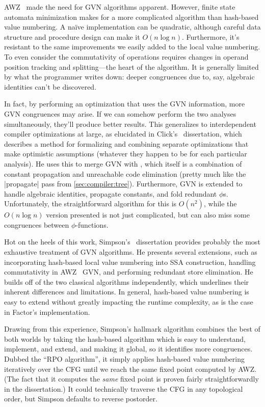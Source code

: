 AWZ~ made the need for \gls{GVN} algorithms apparent.  However,
finite state automata minimization makes for a more complicated algorithm than
hash-based value numbering.  A na\"{i}ve implementation can be quadratic,
although careful data structure and procedure design can make it $O(n\log n)$.
Furthermore, it's resistant to the same improvements we easily added to the
local value numbering.  To even consider the commutativity of operations
requires changes in operand position tracking and splitting---the heart of the
algorithm.  It is generally limited by what the programmer writes down: deeper
congruences due to, say, algebraic identities can't be discovered.

In fact, by performing an optimization that uses the \gls{GVN} information,
more \gls{GVN} congruences may arise.  If we can somehow perform the two
analyses simultaneously, they'll produce better results.  This generalizes to
interdependent compiler optimizations at large, as elucidated in
Click's~ dissertation, which describes a method for formalizing
and combining separate optimizations that make optimistic assumptions (whatever
they happen to be for each particular analysis).  He uses this to merge
\gls{GVN} with , which itself is a
combination of constant propagation and unreachable code elimination (pretty
much like the \factor|propagate| pass from \cref{sec:compiler:tree}).
Furthermore, \gls{GVN} is extended to handle algebraic identities, propagate
constants, and fold redundant $\phi$s.  Unfortunately, the straightforward
algorithm for this is $O(n^2)$, while the $O(n\log n)$ version presented is not
just complicated, but can also miss some congruences between
$\phi$-functions.

Hot on the heels of this work, Simpson's~ dissertation provides
probably the most exhaustive treatment of \gls{GVN} algorithms.  He presents
several extensions, such as incorporating hash-based local value numbering into
\gls{SSA} construction, handling commutativity in AWZ~ \gls{GVN},
and performing redundant store elimination.  He builds off of the two classical
algorithms independently, which underlines their inherent differences and
limitations.  In general, hash-based value numbering is easy to extend without
greatly impacting the runtime complexity, as is the case in Factor's
implementation.

Drawing from this experience, Simpson's hallmark algorithm combines the best of
both worlds by taking the hash-based algorithm which is easy to understand,
implement, and extend, and making it global, so it identifies more congruences.
Dubbed the ``\gls{RPO} algorithm'', it simply applies hash-based value
numbering iteratively over the \gls{CFG} until we reach the same fixed point
computed by AWZ.  (The fact that it computes the \emph{same} fixed
point is proven fairly straightforwardly in the dissertation.)  It could
technically traverse the \gls{CFG} in any topological order, but Simpson
defaults to reverse postorder.

